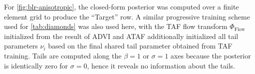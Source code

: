 \documentclass[../../thesis.tex]{subfiles}
\begin{document}
For \cref{fig:blr-anisotropic}, the closed-form posterior was computed over a finite element grid to produce
the ``Target'' row. A similar progressive training scheme used for \cref{tab:diamonds} was also used here, with
the TAF flow transform $\Phi_{\text{Flow}}$ initialized from the result of ADVI and ATAF additionally initialized
all tail parameters $\nu_i$ based on the final shared tail parameter obtained from TAF training. Tails are computed
along the $\beta = 1$ or $\sigma = 1$ axes because the posterior is identically zero for $\sigma = 0$, hence it reveals
no information about the tails.


\end{document}
